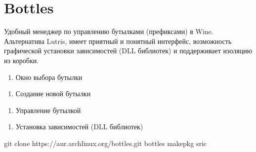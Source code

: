 \documentclass[letterpaper,10pt,russian,openany]{sphinxmanual}
\begin{document}
\ignorespaces 

\section{Bottles}
\label{\detokenize{source/useful-programs:bottles}}\label{\detokenize{source/useful-programs:index-4}}\label{\detokenize{source/useful-programs:id5}}
\sphinxAtStartPar
Удобный менеджер по управлению бутылками (префиксами) в Wine. Альтернатива Lutris, имеет приятный и понятный интерфейс,
возможность графической установки зависимостей (DLL библиотек) и поддерживает изоляцию из коробки.

\sphinxAtStartPar
{}
\begin{enumerate}
%
\item {} 
\sphinxAtStartPar
Окно выбора бутылки

\end{enumerate}

\noindent{}
\begin{enumerate}
%
\setcounter{enumi}{1}
\item {} 
\sphinxAtStartPar
Создание новой бутылки

\end{enumerate}

\noindent{}
\begin{enumerate}
%
\setcounter{enumi}{2}
\item {} 
\sphinxAtStartPar
Управление бутылкой

\end{enumerate}

\noindent{}
\begin{enumerate}
%
\setcounter{enumi}{3}
\item {} 
\sphinxAtStartPar
Установка зависимостей (DLL библиотек)

\end{enumerate}

\noindent{}

\sphinxAtStartPar
{}

\begin{sphinxVerbatim}[commandchars=\\\{\}]
git clone https://aur.archlinux.org/bottles.git 
 bottles                                      
makepkg \PYGZhy{}sric                                   
\end{sphinxVerbatim}



\renewcommand{\indexname}{Алфавитный указатель}
\printindex
\end{document}
